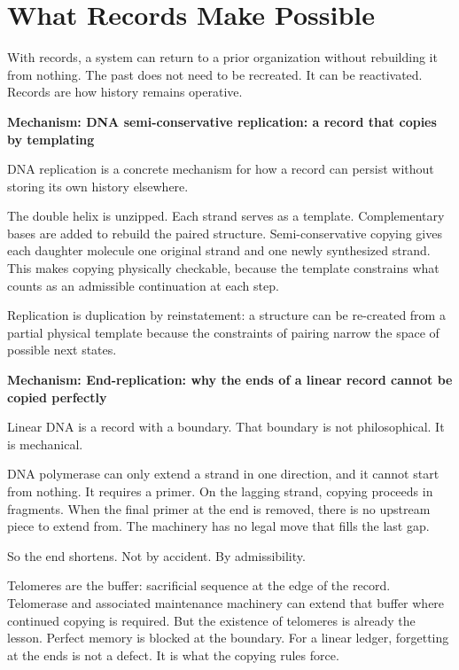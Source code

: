 \documentclass[11pt,twoside,openright]{book}
\newenvironment{mechanismbox}[1]
  {\begin{framed}\noindent\textbf{Mechanism: #1}\par\medskip}
  {\end{framed}}
\begin{document}
\section*{What Records Make Possible}

With records, a system can return to a prior organization without rebuilding it from nothing. The past does not need to be recreated. It can be reactivated. Records are how history remains operative.

\begin{mechanismbox}{DNA semi-conservative replication: a record that copies by templating}
DNA replication is a concrete mechanism for how a record can persist without storing its own history elsewhere.

The double helix is unzipped. Each strand serves as a template. Complementary bases are added to rebuild the paired structure. Semi-conservative copying gives each daughter molecule one original strand and one newly synthesized strand. This makes copying physically checkable, because the template constrains what counts as an admissible continuation at each step.

Replication is duplication by reinstatement: a structure can be re-created from a partial physical template because the constraints of pairing narrow the space of possible next states.
\end{mechanismbox}
\begin{mechanismbox}{End-replication: why the ends of a linear record cannot be copied perfectly}
Linear DNA is a record with a boundary.
That boundary is not philosophical.
It is mechanical.

DNA polymerase can only extend a strand in one direction, and it cannot start from nothing. It requires a primer. On the lagging strand, copying proceeds in fragments. When the final primer at the end is removed, there is no upstream piece to extend from. The machinery has no legal move that fills the last gap.

So the end shortens. Not by accident. By admissibility.

Telomeres are the buffer: sacrificial sequence at the edge of the record.
Telomerase and associated maintenance machinery can extend that buffer where continued copying is required.
But the existence of telomeres is already the lesson.
Perfect memory is blocked at the boundary.
For a linear ledger, forgetting at the ends is not a defect.
It is what the copying rules force.
\end{mechanismbox}
\end{document}
